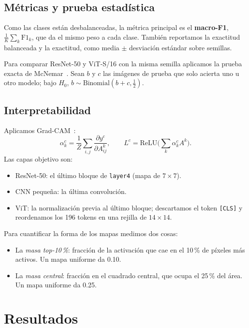 \documentclass[conference,a4paper]{IEEEtran}
\begin{document}
\subsection{Métricas y prueba estadística}
Como las clases están desbalanceadas, la métrica principal es el \textbf{macro-F1}, $\frac{1}{K}\sum_k \mathrm{F1}_k$, que da el mismo peso a cada clase. También reportamos la exactitud balanceada y la exactitud, como media $\pm$ desviación estándar sobre semillas.

Para comparar ResNet-50 y ViT-S/16 con la misma semilla aplicamos la prueba exacta de McNemar~\cite{dietterich1998tests}. Sean $b$ y $c$ las imágenes de prueba que solo acierta uno u otro modelo; bajo $H_0$, $b\sim\mathrm{Binomial}(b+c,\tfrac12)$.

\subsection{Interpretabilidad}
Aplicamos Grad-CAM~\cite{selvaraju2017gradcam}:
\begin{equation}
\alpha_k^c=\frac{1}{Z}\sum_{i,j}\frac{\partial y^c}{\partial A^k_{ij}},\qquad
L^c=\mathrm{ReLU}\Big(\sum_k \alpha_k^c A^k\Big).
\end{equation}
Las capas objetivo son:
\begin{itemize}
\item ResNet-50: el último bloque de \texttt{layer4} (mapa de $7\times7$).
\item CNN pequeña: la última convolución.
\item ViT: la normalización previa al último bloque; descartamos el token \texttt{[CLS]} y reordenamos los 196 tokens en una rejilla de $14\times14$.
\end{itemize}
Para cuantificar la forma de los mapas medimos dos cosas:
\begin{itemize}
\item La \emph{masa top-10\,\%}: fracción de la activación que cae en el 10\,\% de píxeles más activos. Un mapa uniforme da 0.10.
\item La \emph{masa central}: fracción en el cuadrado central, que ocupa el 25\,\% del área. Un mapa uniforme da 0.25.
\end{itemize}

\section{Resultados}\label{sec:results}
\end{document}
